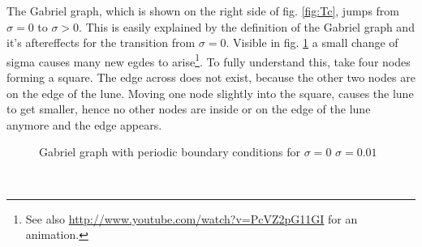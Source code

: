     The Gabriel graph, which is shown on the right side of fig. \ref{fig:Tc},
    jumps from \(\sigma = 0\) to \(\sigma > 0\). This is easily explained
    by the definition of the Gabriel graph and it's aftereffects for
    the transition from \(\sigma = 0\). Visible in fig. \ref{fig:GG_sigma}
    a small change of sigma causes many new egdes to arise\footnote{See also \url{http://www.youtube.com/watch?v=PcVZ2pG11GI} for an animation.}.
    To fully understand this, take four nodes forming a square. The edge
    across does not exist, because the other two nodes are on the edge
    of the lune. Moving one node slightly into the square, causes the lune
    to get smaller, hence no other nodes are inside or on the edge of
    the lune anymore and the edge appears.
    \begin{figure}[htbp]
        \centering
        \caption[]
        {
            Gabriel graph with periodic boundary conditions for
                 \(\sigma = 0\)
                 \(\sigma = 0.01\)
        }
        \label{fig:GG_sigma}
    \end{figure}\\
